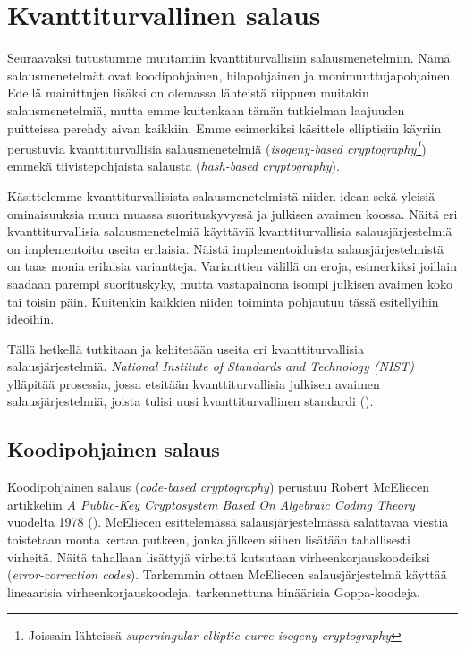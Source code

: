 \chapter{Kvanttiturvallinen salaus\label{results}}
Seuraavaksi tutustumme muutamiin kvanttiturvallisiin salausmenetelmiin. Nämä salausmenetelmät ovat koodipohjainen, hilapohjainen ja monimuuttujapohjainen. Edellä mainittujen lisäksi on olemassa lähteistä riippuen muitakin salausmenetelmiä, mutta emme kuitenkaan tämän tutkielman laajuuden puitteissa perehdy aivan kaikkiin. Emme esimerkiksi käsittele elliptisiin käyriin perustuvia kvanttiturvallisia salausmenetelmiä (\emph{isogeny-based cryptography\footnote{Joissain lähteissä \emph{supersingular elliptic curve isogeny cryptography}}}) emmekä tiivistepohjaista salausta (\emph{hash-based cryptography}).

Käsittelemme kvanttiturvallisista salausmenetelmistä niiden idean sekä yleisiä ominaisuuksia muun muassa suorituskyvyssä ja julkisen avaimen koossa. Näitä eri kvanttiturvallisia salausmenetelmiä käyttäviä kvanttiturvallisia salausjärjestelmiä on implementoitu useita erilaisia. Näistä implementoiduista salausjärjestelmistä on taas monia erilaisia variantteja. Varianttien välillä on eroja, esimerkiksi joillain saadaan parempi suorituskyky, mutta vastapainona isompi julkisen avaimen koko tai toisin päin. Kuitenkin kaikkien niiden toiminta pohjautuu tässä esitellyihin ideoihin.

Tällä hetkellä tutkitaan ja kehitetään useita eri kvanttiturvallisia salausjärjestelmiä. \emph{National Institute of Standards and Technology (NIST)} ylläpitää prosessia, jossa etsitään kvanttiturvallisia julkisen avaimen salausjärjestelmiä, joista tulisi uusi kvanttiturvallinen standardi (\cite{alagic2020status}).

\section{Koodipohjainen salaus}
Koodipohjainen salaus (\emph{code-based cryptography}) perustuu Robert McEliecen artikkeliin \emph{A Public-Key Cryptosystem Based On Algebraic Coding Theory} vuodelta 1978 (\cite{8012331}). McEliecen esittelemässä salausjärjestelmässä salattavaa viestiä toistetaan monta kertaa putkeen, jonka jälkeen siihen lisätään tahallisesti virheitä. Näitä tahallaan lisättyjä virheitä kutsutaan virheenkorjauskoodeiksi (\emph{error-correction codes}). Tarkemmin ottaen McEliecen salausjärjestelmä käyttää lineaarisia virheenkorjauskoodeja, tarkennettuna binäärisia Goppa-koodeja.

